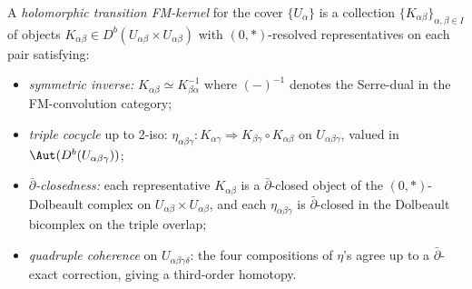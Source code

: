 \begin{definition}
\label{def:holo-fm-kernel}
A \emph{holomorphic transition FM-kernel} for the cover
$\{U_\alpha\}$ is a collection
$\{K_{\alpha\beta}\}_{\alpha,\beta \in I}$ of objects
$K_{\alpha\beta} \in D^b(U_{\alpha\beta} \times U_{\alpha\beta})$
with $(0, \ast)$-resolved representatives on each pair satisfying:
\begin{itemize}
\item[(i)] \emph{symmetric inverse:} $K_{\alpha\beta} \simeq
K_{\beta\alpha}^{-1}$ where $(-)^{-1}$ denotes the Serre-dual in the
FM-convolution category;
\item[(ii)] \emph{triple cocycle} up to 2-iso:
$\eta_{\alpha\beta\gamma}: K_{\alpha\gamma} \Rightarrow
K_{\beta\gamma} \circ K_{\alpha\beta}$ on
$U_{\alpha\beta\gamma}$, valued in
$\Aut(D^b(U_{\alpha\beta\gamma}))$;
\item[(iii)] \emph{$\bar\partial$-closedness:} each representative
$K_{\alpha\beta}$ is a $\bar\partial$-closed object of the
$(0, \ast)$-Dolbeault complex on $U_{\alpha\beta} \times
U_{\alpha\beta}$, and each $\eta_{\alpha\beta\gamma}$ is
$\bar\partial$-closed in the Dolbeault bicomplex on the triple
overlap;
\item[(iv)] \emph{quadruple coherence} on $U_{\alpha\beta\gamma\delta}$:
the four compositions of $\eta$'s agree up to a $\bar\partial$-exact
correction, giving a third-order homotopy.
\end{itemize}
\end{definition}

